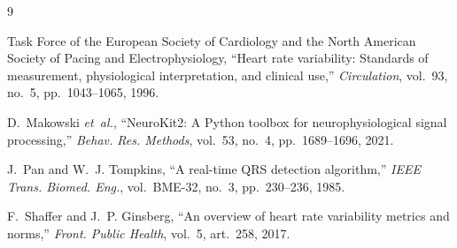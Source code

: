 \documentclass[11pt,a4paper]{article}
\begin{document}
\begin{thebibliography}{9}

Task Force of the European Society of Cardiology and the North American
Society of Pacing and Electrophysiology,
``Heart rate variability: Standards of measurement, physiological
interpretation, and clinical use,''
\emph{Circulation}, vol.~93, no.~5, pp.~1043--1065, 1996.

D.~Makowski \emph{et~al.},
``NeuroKit2: A Python toolbox for neurophysiological signal processing,''
\emph{Behav. Res. Methods}, vol.~53, no.~4, pp.~1689--1696, 2021.

J.~Pan and W.~J. Tompkins,
``A real-time QRS detection algorithm,''
\emph{IEEE Trans. Biomed. Eng.}, vol.~BME-32, no.~3, pp.~230--236, 1985.

F.~Shaffer and J.~P. Ginsberg,
``An overview of heart rate variability metrics and norms,''
\emph{Front. Public Health}, vol.~5, art.~258, 2017.

\end{thebibliography}
\end{document}
